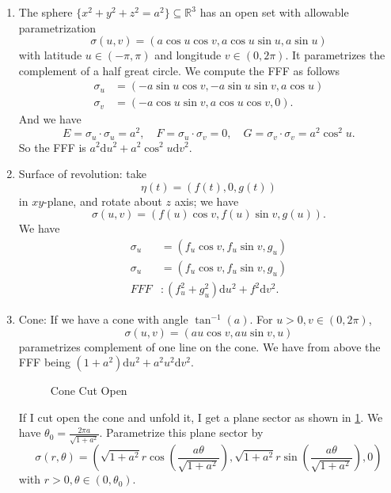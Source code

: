 \begin{example}
    \leavevmode
    \begin{enumerate}
        \item The sphere \(\{x^2 + y^2 + z^2 = a^2\}\subseteq \mathbb{R}^3\) has an open set with allowable parametrization
        \[
            \sigma(u,v) = (a\cos u\cos v,a\cos u\sin u,a\sin u)
        \]
        with latitude \(u \in (-\pi, \pi)\) and longitude \(v \in (0, 2\pi)\). It parametrizes the complement of a half great circle. We compute the FFF as follows
        \begin{align*}
            \sigma_u &= (-a\sin u\cos v, -a\sin u\sin v,a\cos u)\\
            \sigma_v &= (-a\cos u\sin v,a\cos u\cos v,0).
        \end{align*}
        And we have
        \[
            E = \sigma_{u} \cdot \sigma_u = a^2, \quad F=\sigma_u \cdot \sigma_v = 0, \quad G = \sigma_v \cdot \sigma_v = a^{2}\cos^{2}u.
        \]
        So the FFF is \(a^2 \mathrm{d}u^2 + a^2 \cos ^2 u \mathrm{d}v^2\).
        \item Surface of revolution: take
        \[
            \eta(t) = (f(t), 0, g(t))
        \]
        in \(xy\)-plane, and rotate about \(z\) axis; we have
        \[
            \sigma(u,v) = (f(u)\cos v, f(u) \sin v,g(u)).
        \]
        We have
        \begin{align*}
            \sigma_u &= (f_u \cos v, f_u \sin v, g_u)\\
            \sigma_u &= (f_u \cos v, f_u \sin v, g_u)\\
            FFF&:(f_u^2 + g_u^2)\mathrm{d}u^2 + f^2\mathrm{d}v^2.
        \end{align*}
        \item Cone: If we have a cone with angle \(\tan^{-1}(a)\). For \(u>0, v\in (0,2\pi)\),
        \[
            \sigma(u,v) = (au\cos v, au\sin v, u)
        \]
        parametrizes complement of one line on the cone. We have from above the FFF being \((1+a^2)\mathrm{d}u^2 + a^{2}u^2\mathrm{d}v^2\).
        
        \begin{figure}[H]
            \centering
            \caption{Cone Cut Open}
            \label{cutcone}
        \end{figure}
        If I cut open the cone and unfold it, I get a plane sector as shown in \cref{cutcone}. We have \(\theta_0 = \frac{2\pi a}{\sqrt{1 + a^2} }\). Parametrize this plane sector by
        \[
            \sigma(r, \theta) = (\sqrt{1 + a^2}r\cos\left(\frac{a\theta}{\sqrt{1 + a^2} }\right),\sqrt{1 + a^2}r\sin\left(\frac{a\theta}{\sqrt{1 + a^2} }\right),0)
        \]
        with \(r > 0, \theta \in (0, \theta_0)\).
        

\end{enumerate}
\end{example}
